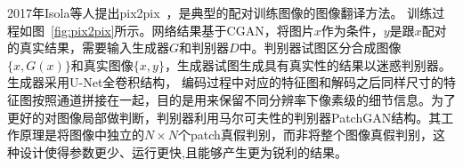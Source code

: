 2017年Isola等人提出pix2pix~\cite{isola2017image}，是典型的配对训练图像的图像翻译方法。
训练过程如图~\ref{fig:pix2pix}所示。网络结果基于CGAN，将图片$x$作为条件，$y$是跟$x$配对的真实结果，需要输入生成器$G$和判别器$D$中。判别器试图区分合成图像$\{x,G(x)\}$和真实图像$\{x,y\}$，生成器试图生成具有真实性的结果以迷惑判别器。
生成器采用U-Net全卷积结构，
编码过程中对应的特征图和解码之后同样尺寸的特征图按照通道拼接在一起，目的是用来保留不同分辨率下像素级的细节信息。为了更好的对图像局部做判断，判别器利用马尔可夫性的判别器PatchGAN结构。其工作原理是将图像中独立的$N \times N$个patch真假判别，而非将整个图像真假判别，这种设计使得参数更少、运行更快,且能够产生更为锐利的结果。








